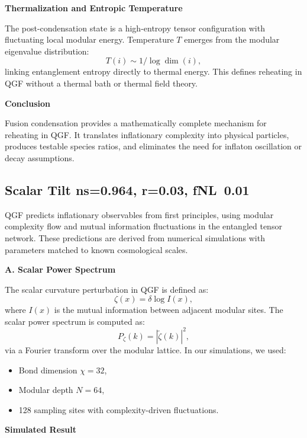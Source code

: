\documentclass[11pt]{article}
\def\frac#1#2{#1/#2}
\def\texorpdfstring#1#2{#2}
\begin{document}
\vspace{0.5em}
\noindent\textbf{Thermalization and Entropic Temperature}

The post-condensation state is a high-entropy tensor configuration with fluctuating local modular energy. Temperature \( T \) emerges from the modular eigenvalue distribution:
\[
T(i) \sim \frac{1}{\log \dim(i)},
\]
linking entanglement entropy directly to thermal energy. This defines reheating in QGF without a thermal bath or thermal field theory.

\vspace{0.5em}
\noindent\textbf{Conclusion}

Fusion condensation provides a mathematically complete mechanism for reheating in QGF. It translates inflationary complexity into physical particles, produces testable species ratios, and eliminates the need for inflaton oscillation or decay assumptions.



\subsection{\texorpdfstring{Scalar Tilt \( n_s = 0.964 \), Tensor Ratio \( r = 0.03 \), and Non-Gaussianity \( f_{\text{NL}} \sim 0.01 \)}{Scalar Tilt ns=0.964, r=0.03, fNL~0.01}}


QGF predicts inflationary observables from first principles, using modular complexity flow and mutual information fluctuations in the entangled tensor network. These predictions are derived from numerical simulations with parameters matched to known cosmological scales.

\vspace{0.5em}
\noindent\textbf{A. Scalar Power Spectrum}

The scalar curvature perturbation in QGF is defined as:
\[
\zeta(x) = \delta \log I(x),
\]
where \( I(x) \) is the mutual information between adjacent modular sites. The scalar power spectrum is computed as:
\[
P_\zeta(k) = |\tilde{\zeta}(k)|^2,
\]
via a Fourier transform over the modular lattice. In our simulations, we used:
\begin{itemize}
  \item Bond dimension \( \chi = 32 \),
  \item Modular depth \( N = 64 \),
  \item 128 sampling sites with complexity-driven fluctuations.
\end{itemize}

\vspace{0.5em}
\noindent\textbf{Simulated Result}
\end{document}
